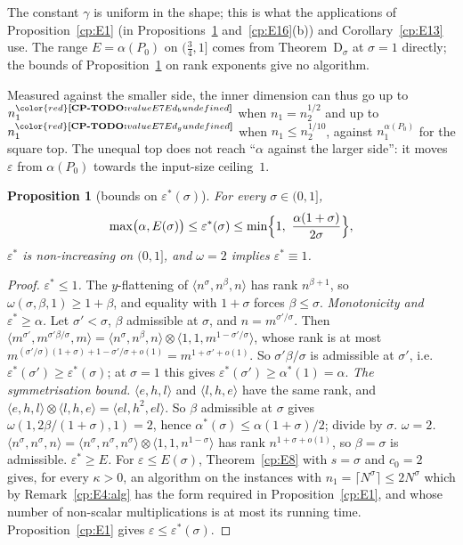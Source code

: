 \documentclass[11pt]{article}
\makeatletter
\newtheorem{proposition}[theorem]{Proposition}
\theoremstyle{definition}
\theoremstyle{remark}
\DeclareRobustCommand{\CPTODO}[1]{{\color{red}\textbf{[CP-TODO:} #1\textbf{]}}}
\providecommand{\eps}{\varepsilon}
\newcommand{\mat}[3]{\langle #1,#2,#3\rangle} %
\newcommand{\ThmDsig}{Theorem~D\texorpdfstring{\ensuremath{_\sigma}}{\_sigma}}   %
\newcommand{\Pzero}{P_0}                      %
\newcommand{\alstar}{\alpha^*}                %
\newcommand{\cpv}[1]{\ifcsname cpv@#1\endcsname\csname cpv@#1\endcsname\else\CPTODO{value #1 undefined}\fi}
\makeatother
\begin{document}
The constant $\gamma$ is uniform in the shape; this is what the applications of Proposition~\ref{cp:E1} (in Propositions~\ref{cp:E2} and~\ref{cp:E16}(b)) and Corollary~\ref{cp:E13} use. The range $E=\alpha(\Pzero)$ on $(\frac34,1]$ comes from \ThmDsig{} at $\sigma=1$ directly; the bounds of Proposition~\ref{cp:E2} on rank exponents give no algorithm.

Measured against the smaller side, the inner dimension can thus go up to $n_1^{\cpv{E7Ed_b}}$ when $n_1=n_2^{1/2}$ and up to $n_1^{\cpv{E7Ed_g}}$ when $n_1\le n_2^{1/10}$, against $n_1^{\alpha(\Pzero)}$ for the square top. The unequal top does not reach ``$\alpha$ against the larger side'': it moves $\eps$ from $\alpha(\Pzero)$ towards the input-size ceiling~$1$.

\begin{proposition}[bounds on $\eps^*(\sigma)$]\label{cp:E2}
For every $\sigma\in(0,1]$,
\[
\max\bigl(\alpha,E(\sigma)\bigr)\le\eps^*(\sigma)\le\min\Bigl\{1,\ \frac{\alpha(1+\sigma)}{2\sigma}\Bigr\},
\]
$\eps^*$ is non-increasing on $(0,1]$, and $\omega=2$ implies $\eps^*\equiv1$.
\end{proposition}

\begin{proof}
\emph{$\eps^*\le1$.} The $y$-flattening of $\mat{n^\sigma}{n^\beta}n$ has rank $n^{\beta+1}$, so $\omega(\sigma,\beta,1)\ge1+\beta$, and equality with $1+\sigma$ forces $\beta\le\sigma$.
\emph{Monotonicity and $\eps^*\ge\alpha$.} Let $\sigma'<\sigma$, $\beta$ admissible at $\sigma$, and $n=m^{\sigma'/\sigma}$. Then $\mat{m^{\sigma'}}{m^{\sigma'\beta/\sigma}}m=\mat{n^\sigma}{n^\beta}n\otimes\mat11{m^{1-\sigma'/\sigma}}$, whose rank is at most $m^{(\sigma'/\sigma)(1+\sigma)+1-\sigma'/\sigma+o(1)}=m^{1+\sigma'+o(1)}$. So $\sigma'\beta/\sigma$ is admissible at $\sigma'$, i.e. $\eps^*(\sigma')\ge\eps^*(\sigma)$; at $\sigma=1$ this gives $\eps^*(\sigma')\ge\alstar(1)=\alpha$.
\emph{The symmetrisation bound.} $\mat ehl$ and $\mat lhe$ have the same rank, and $\mat ehl\otimes\mat lhe=\mat{el}{h^2}{el}$. So $\beta$ admissible at $\sigma$ gives $\omega(1,2\beta/(1+\sigma),1)=2$, hence $\alstar(\sigma)\le\alpha(1+\sigma)/2$; divide by $\sigma$.
\emph{$\omega=2$.} $\mat{n^\sigma}{n^\sigma}n=\mat{n^\sigma}{n^\sigma}{n^\sigma}\otimes\mat11{n^{1-\sigma}}$ has rank $n^{1+\sigma+o(1)}$, so $\beta=\sigma$ is admissible.
\emph{$\eps^*\ge E$.} For $\eps\le E(\sigma)$, Theorem~\ref{cp:E8} with $s=\sigma$ and $c_0=2$ gives, for every $\kappa>0$, an algorithm on the instances with $n_1=\lceil N^\sigma\rceil\le2N^\sigma$ which by Remark~\ref{cp:E4:alg} has the form required in Proposition~\ref{cp:E1}, and whose number of non-scalar multiplications is at most its running time. Proposition~\ref{cp:E1} gives $\eps\le\eps^*(\sigma)$.
\end{proof}
\end{document}
